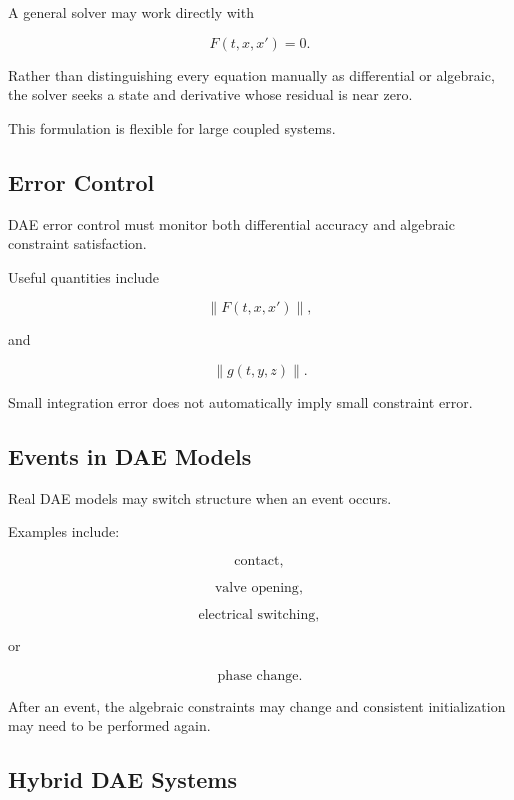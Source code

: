 A general solver may work directly with

\[
\boxed{
F(t,x,x')=0.
}
\]

Rather than distinguishing every equation manually as differential or
algebraic, the solver seeks a state and derivative whose residual is near
zero.

This formulation is flexible for large coupled systems.

\subsection{Error Control}
\label{subsec:dae-error-control}

DAE error control must monitor both differential accuracy and algebraic
constraint satisfaction.

Useful quantities include

\[
\boxed{
\|F(t,x,x')\|,
}
\]

and

\[
\boxed{
\|g(t,y,z)\|.
}
\]

Small integration error does not automatically imply small constraint
error.

\subsection{Events in DAE Models}
\label{subsec:dae-events}

Real DAE models may switch structure when an event occurs.

Examples include:

\[
\boxed{
\text{contact},
}
\]

\[
\boxed{
\text{valve opening},
}
\]

\[
\boxed{
\text{electrical switching},
}
\]

or

\[
\boxed{
\text{phase change}.
}
\]

After an event, the algebraic constraints may change and consistent
initialization may need to be performed again.

\subsection{Hybrid DAE Systems}
\label{subsec:hybrid-dae-systems}

